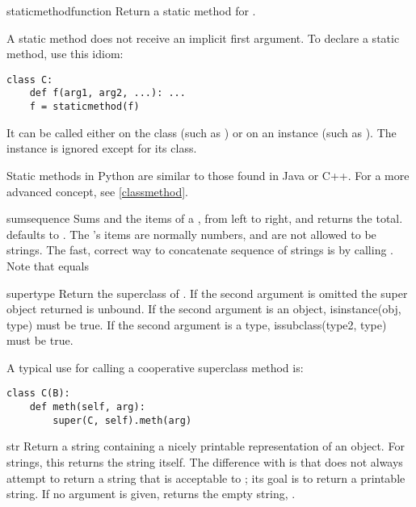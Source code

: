 \begin{funcdesc}{staticmethod}{function}
  \label{staticmethod}
  Return a static method for .

  A static method does not receive an implicit first argument.
  To declare a static method, use this idiom:

\begin{verbatim}
class C:
    def f(arg1, arg2, ...): ...
    f = staticmethod(f)
\end{verbatim}

  It can be called either on the class (such as ) or on an
  instance (such as ).  The instance is ignored except
  for its class.

  Static methods in Python are similar to those found in Java or C++.
  For a more advanced concept, see \ref{classmethod}.
\end{funcdesc}

\begin{funcdesc}{sum}{sequence}
  Sums  and the items of a , from left to
  right, and returns the total.   defaults to .
  The 's items are normally numbers, and are not allowed
  to be strings.  The fast, correct way to concatenate sequence of
  strings is by calling .
  Note that  equals 
\end{funcdesc}

\begin{funcdesc}{super}{type}
  Return the superclass of .  If the second argument is omitted
  the super object returned is unbound.  If the second argument is an
  object, isinstance(obj, type) must be true.  If the second argument is a
  type, issubclass(type2, type) must be true.

  A typical use for calling a cooperative superclass method is:
\begin{verbatim}
class C(B):
    def meth(self, arg):
        super(C, self).meth(arg)
\end{verbatim}
\end{funcdesc}

\begin{funcdesc}{str}{}
  Return a string containing a nicely printable representation of an
  object.  For strings, this returns the string itself.  The
  difference with  is that
   does not always attempt to return a string
  that is acceptable to ; its goal is to return a
  printable string.  If no argument is given, returns the empty
  string, .
\end{funcdesc}

